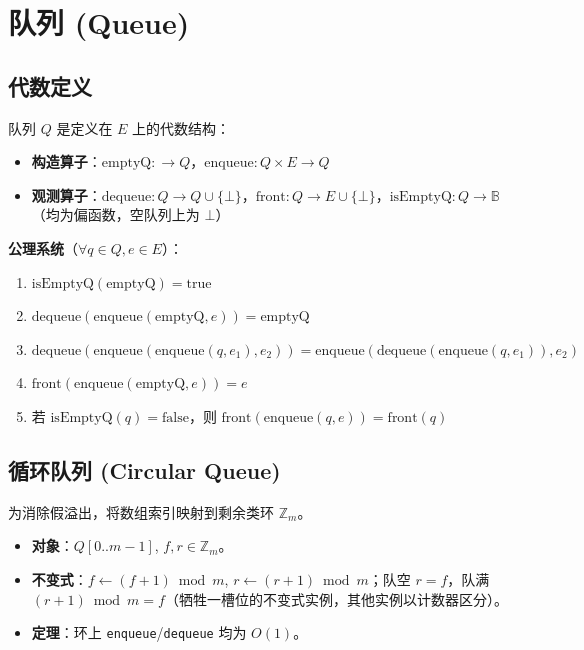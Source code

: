 \section{队列 (Queue)}

\subsection{代数定义}
队列 $Q$ 是定义在 $E$ 上的代数结构：
\begin{itemize}
    \item \textbf{构造算子}：$\text{emptyQ}: \to Q$，$\text{enqueue}: Q \times E \to Q$
    \item \textbf{观测算子}：$\text{dequeue}: Q \to Q \cup \{\bot\}$，$\text{front}: Q \to E \cup \{\bot\}$，$\text{isEmptyQ}: Q \to \mathbb{B}$（均为偏函数，空队列上为 $\bot$）
\end{itemize}

\textbf{公理系统}（$\forall q \in Q, e \in E$）：
\begin{enumerate}
    \item $\text{isEmptyQ}(\text{emptyQ}) = \text{true}$
    \item $\text{dequeue}(\text{enqueue}(\text{emptyQ}, e)) = \text{emptyQ}$
    \item $\text{dequeue}(\text{enqueue}(\text{enqueue}(q, e_1), e_2)) = \text{enqueue}(\text{dequeue}(\text{enqueue}(q, e_1)), e_2)$
    \item $\text{front}(\text{enqueue}(\text{emptyQ}, e)) = e$
    \item 若 $\text{isEmptyQ}(q) = \text{false}$，则 $\text{front}(\text{enqueue}(q, e)) = \text{front}(q)$
\end{enumerate}

\subsection{循环队列 (Circular Queue)}
为消除假溢出，将数组索引映射到剩余类环 $\mathbb{Z}_m$。
\begin{itemize}
    \item \textbf{对象}：$Q[0..m-1]$, $f,r\in\mathbb{Z}_m$。
    \item \textbf{不变式}：$f\leftarrow(f+1)\bmod m$, $r\leftarrow(r+1)\bmod m$；队空 $r=f$，队满 $(r+1)\bmod m=f$（牺牲一槽位的不变式实例，其他实例以计数器区分）。
    \item \textbf{定理}：环上 \texttt{enqueue}/\texttt{dequeue} 均为 $O(1)$。
\end{itemize}

